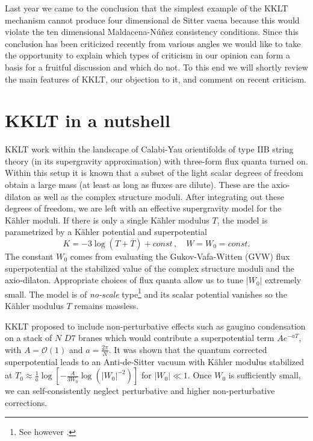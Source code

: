 \documentclass[aps,prd,amsmath,amsfonts,a4paper,11pt,reprint,twocolumn,square,numbers,showpacs,superscriptaddress,floatfix,sort&compress,nofootinbib]{revtex4-1}
\begin{document}
Last year we came to the conclusion that the simplest example of the KKLT mechanism cannot produce four dimensional de Sitter vacua because this would violate the ten dimensional Maldacena-N\'{u}\~{n}ez consistency conditions. Since this conclusion has been criticized recently from various angles we would like to take the opportunity to explain which types of criticism in our opinion can form a basis for a fruitful discussion and which do not. To this end we will shortly review the main features of KKLT, our objection to it, and comment on recent criticism.

\section{KKLT in a nutshell}
KKLT work within the landscape of Calabi-Yau orientifolds of type IIB string theory (in its supergravity approximation) with three-form flux quanta turned on. Within this setup it is known that a subset of the light scalar degrees of freedom obtain a large mass (at least as long as fluxes are dilute). These are the axio-dilaton as well as the complex structure moduli. After integrating out these degrees of freedom, we are left with an effective supergravity model for the K\"ahler moduli. If there is only a single K\"ahler modulus $T$, the model is parametrized by a K\"ahler potential and superpotential
\begin{equation}
K=-3\log(T+\overline{T}) +const\, ,\quad W=W_0=const.
\end{equation}
The constant $W_0$ comes from evaluating the Gukov-Vafa-Witten (GVW) flux superpotential at the stabilized value of the complex structure moduli and the axio-dilaton. Appropriate choices of flux quanta allow us to tune $|W_0|$ extremely small. The model is of \textit{no-scale} type\footnote{See however \cite{Sethi:2017phn}. 
} and its scalar potential vanishes so the K\"ahler modulus $T$ remains massless.

KKLT proposed to include non-perturbative effects such as gaugino condensation on a stack of $N$ $D7$ branes which would contribute a superpotential term $Ae^{-aT}$, with $A=\mathcal{O}(1)$ and $a=\frac{2\pi}{N}$. It was shown that the quantum corrected superpotential leads to an Anti-de-Sitter vacuum with K\"ahler modulus stabilized at $T_0\approx \frac{1}{a}\log\left[-\frac{A}{3W_0}\log(|W_0|^{-2})\right]$ for $|W_0|\ll 1$. Once $W_0$ is sufficiently small, we can self-consistently neglect perturbative and higher non-perturbative corrections. 
\end{document}
